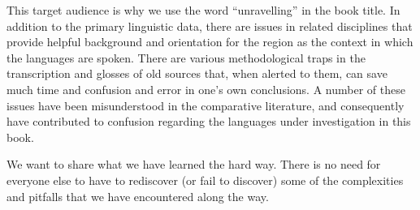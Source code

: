 This target audience is why we use the word “unravelling” in the book title.
In addition to the primary linguistic data,
there are issues in related disciplines that provide helpful background
and orientation for the region as the context in which the languages are spoken.
There are various methodological traps in the transcription
and glosses of old sources that,
when alerted to them,
can save much time
and confusion and error in one’s own conclusions.
A number of these issues have been misunderstood in the comparative literature,
and consequently have contributed to confusion regarding the languages under investigation in this book.

We want to share what we have learned the hard way.
There is no need for everyone else to have to rediscover (or fail to discover) some of the complexities
and pitfalls that we have encountered along the way.